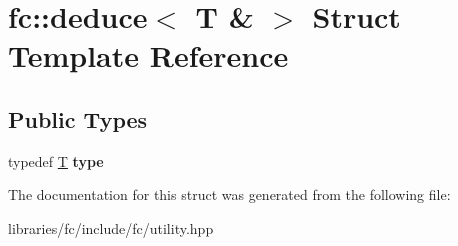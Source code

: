 \hypertarget{structfc_1_1deduce_3_01_t_01_6_01_4}{}\section{fc\+:\+:deduce$<$ T \& $>$ Struct Template Reference}
\label{structfc_1_1deduce_3_01_t_01_6_01_4}
\subsection*{Public Types}
\begin{DoxyCompactItemize}
\item 
\mbox{\label{structfc_1_1deduce_3_01_t_01_6_01_4_a32b09682d33a4802fd86e34c79b9c4ce}} 
typedef \mbox{\hyperlink{struct_t}{T}} {\bfseries type}
\end{DoxyCompactItemize}


The documentation for this struct was generated from the following file\+:\begin{DoxyCompactItemize}
\item 
libraries/fc/include/fc/utility.\+hpp\end{DoxyCompactItemize}

